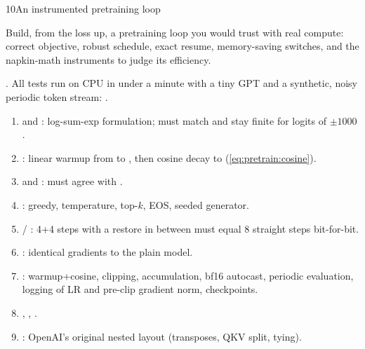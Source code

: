 \begin{labbox}{10}{An instrumented pretraining loop}

Build, from the loss up, a pretraining loop you would trust with real compute: correct
objective, robust schedule, exact resume, memory-saving switches, and the napkin-math
instruments to judge its efficiency.

. All tests run on CPU in under a minute
with a tiny GPT and a synthetic, noisy periodic token stream:
.

\begin{enumerate}
\item {} and : log-sum-exp formulation; must
  match  and stay finite for logits of $\pm1000$.
\item {}: linear warmup from  to , then
  cosine decay to  (\cref{eq:pretrain:cosine}).
\item {} and : must agree with
  .
\item {}: greedy, temperature, top-$k$, EOS, seeded generator.
\item {} / : 4+4 steps with a restore in between
  must equal 8 straight steps bit-for-bit.
\item {}: identical gradients to the plain model.
\item {}: warmup+cosine, clipping, accumulation, bf16 autocast, periodic
  evaluation, logging of LR and pre-clip gradient norm, checkpoints.
\item {}, , .
\item {}: OpenAI's original nested layout (transposes, QKV split,
  tying).
\end{enumerate}


\end{labbox}
